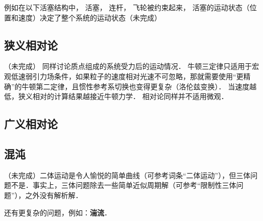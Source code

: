 例如在以下活塞结构中， 活塞， 连杆， 飞轮被约束起来， 活塞的运动状态（位置和速度）决定了整个系统的运动状态（未完成）%

\subsection{狭义相对论}
（未完成）
同样讨论质点组成的系统受力后的运动情况． 牛顿三定律只适用于宏观低速弱引力场条件，如果粒子的速度相对光速不可忽略，那就需要使用“更精确”的牛顿第二定律，且惯性参考系切换也变得更复杂（洛伦兹变换）． 当速度越低，狭义相对的计算结果越接近牛顿力学． 相对论同样并不适用微观．

\subsection{广义相对论}

\subsection{混沌}
（未完成）二体运动是令人愉悦的简单曲线（可参考词条“二体运动”），但三体问题不是．事实上，三体问题除去一些简单近似周期解（可参考“限制性三体问题”），之外没有解析解．

还有更复杂的问题，例如：\textbf{湍流}．
